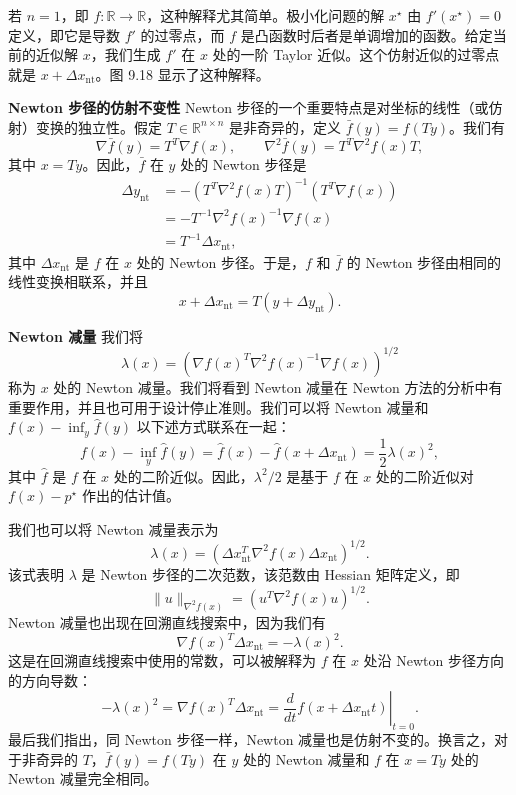 \documentclass[UTF8, 12pt, fontset=fandol, oneside]{ctexart}
\begin{document}
若 $n=1$，即 $f:\mathbb{R}\to\mathbb{R}$，这种解释尤其简单。极小化问题的解 $x^\star$ 由 $f'(x^\star)=0$ 定义，即它是导数 $f'$ 的过零点，而 $f$ 是凸函数时后者是单调增加的函数。给定当前的近似解 $x$，我们生成 $f'$ 在 $x$ 处的一阶 Taylor 近似。这个仿射近似的过零点就是 $x+\Delta x_{\mathrm{nt}}$。图 9.18 显示了这种解释。

\noindent\textbf{Newton 步径的仿射不变性}\quad
Newton 步径的一个重要特点是对坐标的线性（或仿射）变换的独立性。假定
$T\in\mathbb{R}^{n\times n}$ 是非奇异的，定义 $\bar{f}(y)=f(Ty)$。我们有
\[
\nabla\bar{f}(y)=T^T\nabla f(x),\qquad \nabla^2\bar{f}(y)=T^T\nabla^2f(x)T,
\]
其中 $x=Ty$。因此，$\bar{f}$ 在 $y$ 处的 Newton 步径是
\[
\begin{aligned}
\Delta y_{\mathrm{nt}}
&=-(T^T\nabla^2f(x)T)^{-1}(T^T\nabla f(x))\\
&=-T^{-1}\nabla^2f(x)^{-1}\nabla f(x)\\
&=T^{-1}\Delta x_{\mathrm{nt}},
\end{aligned}
\]
其中 $\Delta x_{\mathrm{nt}}$ 是 $f$ 在 $x$ 处的 Newton 步径。于是，$f$ 和 $\bar{f}$ 的 Newton 步径由相同的线性变换相联系，并且
\[
x+\Delta x_{\mathrm{nt}}=T(y+\Delta y_{\mathrm{nt}}).
\]

\noindent\textbf{Newton 减量}\quad
我们将
\[
\lambda(x)=\left(\nabla f(x)^T\nabla^2 f(x)^{-1}\nabla f(x)\right)^{1/2}
\]
称为 $x$ 处的 Newton 减量。我们将看到 Newton 减量在 Newton 方法的分析中有重要作用，并且也可用于设计停止准则。我们可以将 Newton 减量和 $f(x)-\inf_y\hat{f}(y)$ 以下述方式联系在一起：
\[
f(x)-\inf_y\hat{f}(y)=\hat{f}(x)-\hat{f}(x+\Delta x_{\mathrm{nt}})=\frac{1}{2}\lambda(x)^2,
\]
其中 $\hat{f}$ 是 $f$ 在 $x$ 处的二阶近似。因此，$\lambda^2/2$ 是基于 $f$ 在 $x$ 处的二阶近似对 $f(x)-p^\star$ 作出的估计值。

我们也可以将 Newton 减量表示为
\begin{equation}
\lambda(x)=\left(\Delta x_{\mathrm{nt}}^T\nabla^2f(x)\Delta x_{\mathrm{nt}}\right)^{1/2}.
\tag{9.29}
\end{equation}
该式表明 $\lambda$ 是 Newton 步径的二次范数，该范数由 Hessian 矩阵定义，即
\[
\|u\|_{\nabla^2 f(x)}=(u^T\nabla^2f(x)u)^{1/2}.
\]
Newton 减量也出现在回溯直线搜索中，因为我们有
\begin{equation}
\nabla f(x)^T\Delta x_{\mathrm{nt}}=-\lambda(x)^2.
\tag{9.30}
\end{equation}
这是在回溯直线搜索中使用的常数，可以被解释为 $f$ 在 $x$ 处沿 Newton 步径方向的方向导数：
\[
-\lambda(x)^2=\nabla f(x)^T\Delta x_{\mathrm{nt}}=\left.\frac{d}{dt}f(x+\Delta x_{\mathrm{nt}}t)\right|_{t=0}.
\]
最后我们指出，同 Newton 步径一样，Newton 减量也是仿射不变的。换言之，对于非奇异的 $T$，$\bar{f}(y)=f(Ty)$ 在 $y$ 处的 Newton 减量和 $f$ 在 $x=Ty$ 处的 Newton 减量完全相同。
\end{document}

